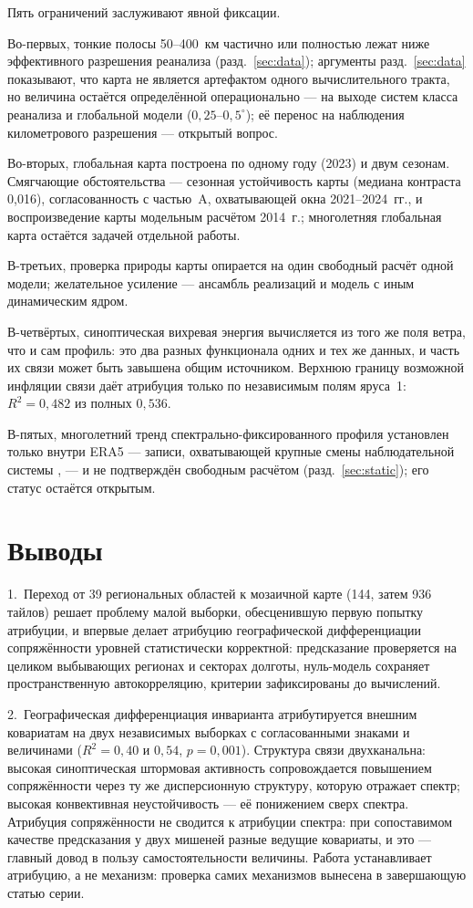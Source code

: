 \documentclass[11pt,a4paper]{article}
\begin{document}
Пять ограничений заслуживают явной фиксации.

Во-первых, тонкие полосы 50--400~км частично или полностью лежат ниже эффективного разрешения реанализа (разд.~\ref{sec:data}); аргументы разд.~\ref{sec:data} показывают, что карта не является артефактом одного вычислительного тракта, но величина остаётся определённой операционально --- на выходе систем класса реанализа и глобальной модели ($0{,}25$--$0{,}5^\circ$); её перенос на наблюдения километрового разрешения --- открытый вопрос.

Во-вторых, глобальная карта построена по одному году (2023) и двум сезонам. Смягчающие обстоятельства --- сезонная устойчивость карты (медиана контраста 0,016), согласованность с частью~A, охватывающей окна 2021--2024~гг., и воспроизведение карты модельным расчётом 2014~г.; многолетняя глобальная карта остаётся задачей отдельной работы.

В-третьих, проверка природы карты опирается на один свободный расчёт одной модели; желательное усиление --- ансамбль реализаций и модель с иным динамическим ядром.

В-четвёртых, синоптическая вихревая энергия вычисляется из того же поля ветра, что и сам профиль: это два разных функционала одних и тех же данных, и часть их связи может быть завышена общим источником. Верхнюю границу возможной инфляции связи даёт атрибуция только по независимым полям яруса~1: $R^2=0{,}482$ из полных $0{,}536$.

В-пятых, многолетний тренд спектрально-фиксированного профиля установлен только внутри ERA5 --- записи, охватывающей крупные смены наблюдательной системы \cite{Bengtsson2004}, --- и не подтверждён свободным расчётом (разд.~\ref{sec:static}); его статус остаётся открытым.

\section{Выводы}
\label{sec:conclusion}

1.~Переход от 39 региональных областей к мозаичной карте (144, затем 936 тайлов) решает проблему малой выборки, обесценившую первую попытку атрибуции, и впервые делает атрибуцию географической дифференциации сопряжённости уровней статистически корректной: предсказание проверяется на целиком выбывающих регионах и секторах долготы, нуль-модель сохраняет пространственную автокорреляцию, критерии зафиксированы до вычислений.

2.~Географическая дифференциация инварианта атрибутируется внешним ковариатам на двух независимых выборках с согласованными знаками и величинами ($R^2=0{,}40$ и $0{,}54$, $p=0{,}001$). Структура связи двухканальна: высокая синоптическая штормовая активность сопровождается повышением сопряжённости через ту же дисперсионную структуру, которую отражает спектр; высокая конвективная неустойчивость --- её понижением сверх спектра. Атрибуция сопряжённости не сводится к атрибуции спектра: при сопоставимом качестве предсказания у двух мишеней разные ведущие ковариаты, и это --- главный довод в пользу самостоятельности величины. Работа устанавливает атрибуцию, а не механизм: проверка самих механизмов вынесена в завершающую статью серии.
\end{document}
